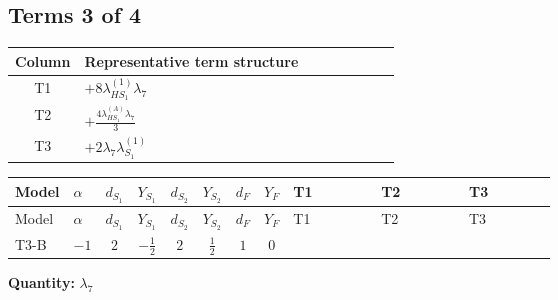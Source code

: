 \documentclass[8pt]{article}
\begin{document}
\begin{landscape}
\subsection*{Terms 3 of 4}
\begin{center}
\begin{tabular}{@{}c >{\raggedright\arraybackslash}p{0.82\linewidth}@{}}
\toprule
Column & Representative term structure \\
\midrule
T1 & \(\displaystyle +8 {\lambda_{HS_1}^{(1)}} {\lambda_7}\) \\
\midrule
T2 & \(\displaystyle +\frac{4 {\lambda_{HS_1}^{(A)}} {\lambda_7}}{3}\) \\
\midrule
T3 & \(\displaystyle +2 {\lambda_7} {\lambda_{S_1}^{(1)}}\) \\
\midrule
\bottomrule
\end{tabular}
\end{center}
\smallskip
\tiny
\begin{longtable}{@{}llcccccc >{\raggedright\arraybackslash}p{0.21\linewidth} >{\raggedright\arraybackslash}p{0.21\linewidth} >{\raggedright\arraybackslash}p{0.21\linewidth}@{}}
\toprule
Model & $\alpha$ & $d_{S_1}$ & $Y_{S_1}$ & $d_{S_2}$ & $Y_{S_2}$ & $d_F$ & $Y_F$ & T1 & T2 & T3 \\
\midrule
\endfirsthead
\toprule
Model & $\alpha$ & $d_{S_1}$ & $Y_{S_1}$ & $d_{S_2}$ & $Y_{S_2}$ & $d_F$ & $Y_F$ & T1 & T2 & T3 \\
\midrule
\endhead
T3-B & $-1$ & $2$ & $-\frac{1}{2}$ & $2$ & $\frac{1}{2}$ & $1$ & $0$ & \scriptsize\adjustbox{max width=\linewidth}{$\begin{gathered} +8 {\lambda_{HS_1}^{(1)}} {\lambda_7}\end{gathered}$} & \scriptsize\adjustbox{max width=\linewidth}{$\begin{gathered} +\frac{4 {\lambda_{HS_1}^{(A)}} {\lambda_7}}{3}\end{gathered}$} & \scriptsize\adjustbox{max width=\linewidth}{$\begin{gathered} +2 {\lambda_7} {\lambda_{S_1}^{(1)}}\end{gathered}$} \\
\midrule
\bottomrule
\end{longtable}
\clearpage
\noindent\textbf{Quantity: }$\lambda_{7}$\par\smallskip

\end{landscape}
\end{document}
